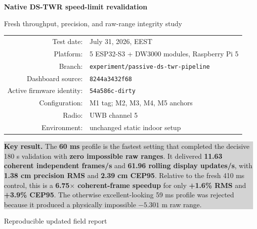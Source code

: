 \documentclass[11pt,a4paper]{article}
\newcommand{\dstwr}{DS-TWR}
\begin{document}

\begin{titlepage}
  \centering
  \vspace*{15mm}
  {\Huge\bfseries Native \dstwr{} speed-limit revalidation\par}
  \vspace{4mm}
  {\Large Fresh throughput, precision, and raw-range integrity study\par}
  \vspace{15mm}

  \begin{tabular}{rl}
    Test date: & July 31, 2026, EEST\\
    Platform: & 5 ESP32-S3 + DW3000 modules, Raspberry Pi 5\\
    Branch: & \texttt{experiment/passive-ds-twr-pipeline}\\
    Dashboard source: & \texttt{8244a3432f68}\\
    Active firmware identity: & \texttt{54a586c-dirty}\\
    Configuration: & M1 tag; M2, M3, M4, M5 anchors\\
    Radio: & UWB channel 5\\
    Environment: & unchanged static indoor setup\\
  \end{tabular}

  \vfill
  \colorbox{lightgray}{%
    \begin{minipage}{0.88\textwidth}
      \vspace{3mm}
      \textbf{Key result.}
      The \textbf{60 ms} profile is the fastest setting that completed the
      decisive 180 s validation with \textbf{zero impossible raw ranges}.
      It delivered \textbf{11.63 coherent independent frames/s} and
      \textbf{61.96 rolling display updates/s}, with
      \textbf{1.38 cm precision RMS} and \textbf{2.39 cm CEP95}.
      Relative to the fresh 410 ms control, this is a
      \textbf{6.75$\times$ coherent-frame speedup} for only
      \textbf{+1.6\% RMS} and \textbf{+3.9\% CEP95}.
      The otherwise excellent-looking 59 ms profile was rejected because it
      produced a physically impossible $-5.301$ m raw range.
      \vspace{3mm}
    \end{minipage}}
  \vfill
  {\large Reproducible updated field report\par}
  \vspace{5mm}
\end{titlepage}
\end{document}
